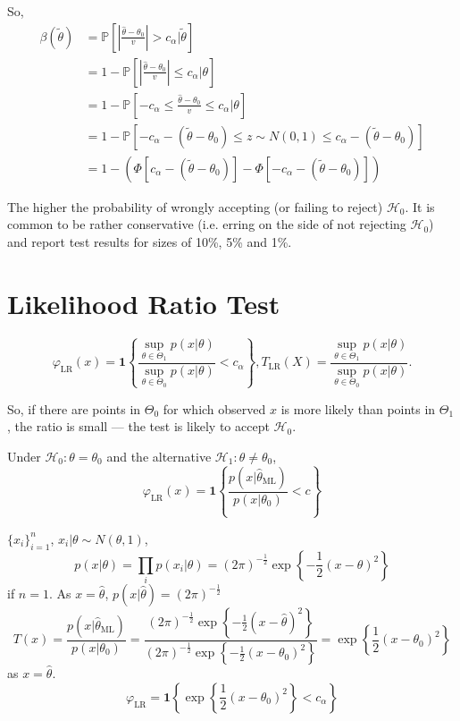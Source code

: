 So,
\begin{align*}
  \beta (\tilde{\theta}) & = \mathbb{P} \left[ \left| \frac{\hat{\theta} -
  \theta_0}{v} \right| > c_{\alpha} | \tilde{\theta}
  \right]\\
  & = 1 - \mathbb{P} \left[ \left| \frac{\hat{\theta} - \theta_0}{v}
  \right| \leq c_{\alpha} | \theta \right]\\
  & = 1 - \mathbb{P} \left[ - c_{\alpha} \leq \frac{\hat{\theta} -
  \theta_0}{v} \leq c_{\alpha} | \theta \right]\\
  & = 1 - \mathbb{P} [- c_{\alpha} - (\tilde{\theta} - \theta_0) \leq z
  \sim N (0, 1) \leq c_{\alpha} - (\tilde{\theta} - \theta_0)]\\
  & = 1 - (\Phi [c_{\alpha} - (\tilde{\theta} - \theta_0)] - \Phi [-
  c_{\alpha} - (\tilde{\theta} - \theta_0)])
\end{align*}

The higher the probability of wrongly accepting (or failing to reject)
$\mathcal{H}_0$. It is common to be rather conservative (i.e. erring on the
side of not rejecting $\mathcal{H}_0$) and report test results for sizes of
10\%, 5\% and 1\%.

\section{Likelihood Ratio Test}

\begin{definition}
  \[ \varphi_{\text{LR}} (x) = \mathbf{1} \left\{ \frac{\underset{\theta \in
     \Theta_1}{\sup} p (x | \theta)}{\underset{\theta \in
     \Theta_0}{\sup} p (x | \theta)} < c_{\alpha} \right\},
     T_{\text{LR}} (X) = \frac{\underset{\theta \in \Theta_1}{\sup} p (x |
  \theta)}{\underset{\theta \in \Theta_0}{\sup} p (x | \theta)}.\]
\end{definition}

So, if there are points in $\Theta_0$ for which observed $x$ is more likely
than points in $\Theta_1$, the ratio is small --- the test is likely to accept
$\mathcal{H}_0$.

Under $\mathcal{H}_0 : \theta = \theta_0$ and the alternative $\mathcal{H}_1 :
\theta \neq \theta_0$,
\[ \varphi_{\text{LR}} (x) = \mathbf{1} \left\{ \frac{p (x |
   \hat{\theta}_{\text{ML}})}{p (x | \theta_0)} < c \right\} \]

\begin{eg}
  $\{ x_i \}_{i = 1}^n$, $x_i | \theta \sim N (\theta, 1)$,
  \[ p (x | \theta) = \prod_i p (x_i | \theta) = (2
     \pi)^{- \frac{1}{2}} \exp \left\{ - \frac{1}{2} (x - \theta)^2 \right\}
  \]
  if $n = 1$. As $x = \hat{\theta}$, $p (x | \hat{\theta}) = (2
  \pi)^{- \frac{1}{2}}$
  \[ T (x) = \frac{p (x | \hat{\theta}_{\text{ML}})}{p (x |
     \theta_0)} = \frac{(2 \pi)^{- \frac{1}{2}} \exp \left\{ -
     \frac{1}{2} (x - \hat{\theta})^2 \right\}}{(2 \pi)^{- \frac{1}{2}} \exp
     \left\{ - \frac{1}{2} (x - \theta_0)^2 \right\}} = \exp \left\{
     \frac{1}{2} (x - \theta_0)^2 \right\} \]
  as $x = \hat{\theta}$.
  \[ \varphi_{\text{LR}} = \mathbf{1} \left\{ \exp \left\{ \frac{1}{2} (x -
     \theta_0)^2 \right\} < c_{\alpha} \right\} \]
\end{eg}

